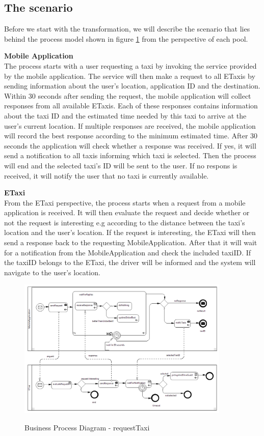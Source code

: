 \newpage
\subsection{The scenario}
Before we start with the transformation, we will describe the scenario that lies behind the process model shown in figure \ref{fig:example} from the perspective of each pool. 

\textbf{Mobile Application}\\
The process starts with a user requesting a taxi by invoking the service provided by the mobile application. The service will then make a request to all ETaxis by sending information about the user's location, application ID and the destination. Within 30 seconds after sending the request, the mobile application will collect responses from all available ETaxis. Each of these responses contains information about the taxi ID and the estimated time needed by this taxi to arrive at the user's current location. If multiple responses are received, the mobile application will record the best response according to the minimum estimated time. After 30 seconds the application will check whether a response was received. If yes, it will send a notification to all taxis informing which taxi is selected. Then the process will end and the selected taxi's ID will be sent to the user. If no respons is received, it will notify the user that no taxi is currently available. 


\textbf{ETaxi}\\
From the ETaxi perspective, the process starts when a request from a mobile application is received. It will then evaluate the request and decide whether or not the request is interesting e.g according to the distance between the taxi's location and the user's location. If the request is interesting, the ETaxi will then send a response back to the requesting MobileApplication. After that it will wait for a notification from the MobileApplication and check the included taxiID. If the taxiID belongs to the ETaxi, the driver will be informed and the system will navigate to the user's location.


\begin{figure}
	\centering
		\includegraphics[width = 0.9\textwidth]{images/example/requestTaxi.png}
	\label{fig:example}
	\caption{Business Process Diagram - requestTaxi}
\end{figure}


